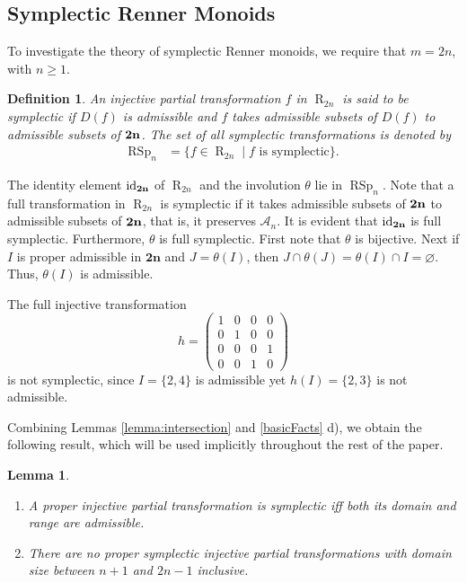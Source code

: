 \documentclass[11pt]{article}
\newtheorem{lemma}[theorem]{Lemma}
\newtheorem{defi}[theorem]{Definition}
\newcommand{\ges}{\geqslant}
\newcommand{\mb}{\mathbf}
\DeclareMathOperator{\id}{id}
\DeclareMathOperator{\RSp}{RSp}
\DeclareMathOperator{\R}{R}
\begin{document}
\subsection{Symplectic Renner Monoids}


To investigate the theory of symplectic Renner monoids, we require that $m=2n$, with $n\ges 1$.

\begin{defi}{\label{symplecticTransformation}} An injective partial transformation $f$ in $\R_{2n}$ is said to be \emph{symplectic} if $D(f)$ is admissible and $f$ takes admissible subsets of $D(f)$ to admissible subsets of $\bf 2n$. The set of all symplectic transformations is denoted by
\[
    \begin{aligned}
        \RSp_n   &= \{f\in \R_{2n} \mid f \mbox{ is symplectic}\}.
    \end{aligned}
\]
\end{defi}

The identity element $\id_{\bf 2n}$ of $\R_{2n}$ and the involution $\theta$ lie in $\RSp_{n}$.
%
Note that a full transformation in $\R_{2n}$  is symplectic if it takes admissible subsets of $\bf 2n$ to admissible subsets of $\bf 2n$, that is, it preserves $\mathscr{A}_n$. It is evident that $\id_{\bf 2n}$ is full symplectic. Furthermore, $\theta$ is full symplectic. First note that $\theta$ is bijective. Next if $I$ is proper admissible in $\mb{2n}$ and $J=\theta(I)$, then $J\cap\theta(J)=\theta(I)\cap I=\varnothing$. Thus, $\theta(I)$ is admissible.  

The full injective transformation
\[
h=\begin{pmatrix}
1&0&0&0\\
0&1&0&0\\
0&0&0&1\\
0&0&1&0
\end{pmatrix}
\]
is not symplectic, since $I=\{2,4\}$ is admissible yet $h(I)=\{2,3\}$ is not admissible. 

Combining Lemmas \ref{lemma:intersection} and \ref{basicFacts} d), we obtain the following result, which will be used implicitly throughout the rest of the paper.
\begin{lemma}{\label{lemma:properSymplectic}}
  \begin{enumerate}[\upshape a)]
    \item A proper injective partial transformation is symplectic if{f} both its domain and range are admissible.
        \vspace{-2mm}
    \item There are no proper symplectic injective partial transformations with domain size between $n+1$ and $2n-1$ inclusive.
  \end{enumerate}
\end{lemma}
\end{document}
